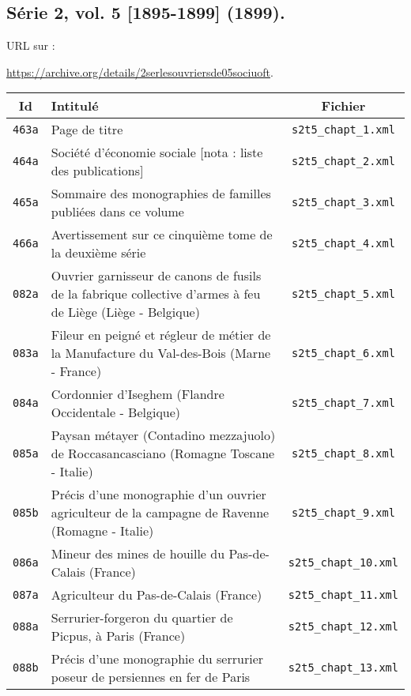\subsection{Série 2, vol. 5 [1895-1899] (1899).}
\label{mappings2t5}

URL sur \ia{} : 

\url{https://archive.org/details/2serlesouvriersde05sociuoft}.

\begin{center}
\begin{longtable}{ | c | p{9.5cm} | c | }
\hline
Id & Intitulé & Fichier \\ \hline
\texttt{463a} & Page de titre & \texttt{s2t5\_chapt\_1.xml} \\ \hline
\texttt{464a} & Société d'économie sociale [nota : liste des publications] & \texttt{s2t5\_chapt\_2.xml} \\ \hline
\texttt{465a} & Sommaire des monographies de familles publiées dans ce volume & \texttt{s2t5\_chapt\_3.xml} \\ \hline
\texttt{466a} & Avertissement sur ce cinquième tome de la deuxième série & \texttt{s2t5\_chapt\_4.xml} \\ \hline
\texttt{082a} & Ouvrier garnisseur de canons de fusils de la fabrique collective d'armes à feu de Liège (Liège - Belgique) & \texttt{s2t5\_chapt\_5.xml} \\ \hline
\texttt{083a} & Fileur en peigné et régleur de métier de la Manufacture du Val-des-Bois (Marne - France) & \texttt{s2t5\_chapt\_6.xml} \\ \hline
\texttt{084a} & Cordonnier d'Iseghem (Flandre Occidentale - Belgique) & \texttt{s2t5\_chapt\_7.xml} \\ \hline
\texttt{085a} & Paysan métayer (Contadino mezzajuolo) de Roccasancasciano (Romagne Toscane - Italie) & \texttt{s2t5\_chapt\_8.xml} \\ \hline
\texttt{085b} & Précis d'une monographie d'un ouvrier agriculteur de la campagne de Ravenne (Romagne - Italie) & \texttt{s2t5\_chapt\_9.xml} \\ \hline
\texttt{086a} & Mineur des mines de houille du Pas-de-Calais (France) & \texttt{s2t5\_chapt\_10.xml} \\ \hline
\texttt{087a} & Agriculteur du Pas-de-Calais (France) & \texttt{s2t5\_chapt\_11.xml} \\ \hline
\texttt{088a} & Serrurier-forgeron du quartier de Picpus, à Paris (France) & \texttt{s2t5\_chapt\_12.xml} \\ \hline
\texttt{088b} & Précis d'une monographie du serrurier poseur de persiennes en fer de Paris & \texttt{s2t5\_chapt\_13.xml} \\ \hline

\end{longtable}
\end{center}
